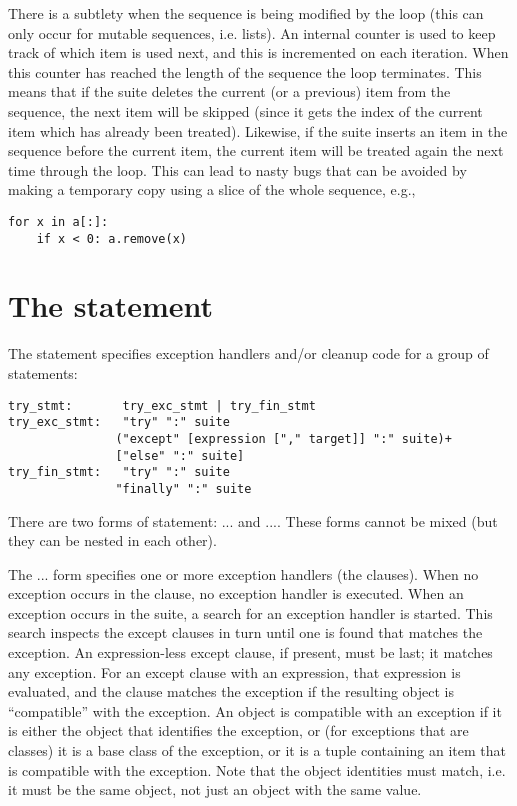  There is a subtlety when the sequence is being modified
by the loop (this can only occur for mutable sequences, i.e. lists).
An internal counter is used to keep track of which item is used next,
and this is incremented on each iteration.  When this counter has
reached the length of the sequence the loop terminates.  This means that
if the suite deletes the current (or a previous) item from the
sequence, the next item will be skipped (since it gets the index of
the current item which has already been treated).  Likewise, if the
suite inserts an item in the sequence before the current item, the
current item will be treated again the next time through the loop.
This can lead to nasty bugs that can be avoided by making a temporary
copy using a slice of the whole sequence, e.g.,

\begin{verbatim}
for x in a[:]:
    if x < 0: a.remove(x)
\end{verbatim}

\section{The  statement\label{try}}

The  statement specifies exception handlers and/or cleanup
code for a group of statements:

\begin{verbatim}
try_stmt:       try_exc_stmt | try_fin_stmt
try_exc_stmt:   "try" ":" suite
               ("except" [expression ["," target]] ":" suite)+
               ["else" ":" suite]
try_fin_stmt:   "try" ":" suite
               "finally" ":" suite
\end{verbatim}

There are two forms of  statement:
... and
....  These forms cannot be mixed (but
they can be nested in each other).

The ... form specifies one or more
exception handlers
(the  clauses).  When no exception occurs in the
 clause, no exception handler is executed.  When an
exception occurs in the  suite, a search for an exception
handler is started.  This search inspects the except clauses in turn until
one is found that matches the exception.  An expression-less except
clause, if present, must be last; it matches any exception.  For an
except clause with an expression, that expression is evaluated, and the
clause matches the exception if the resulting object is ``compatible''
with the exception.  An object is compatible with an exception if it
is either the object that identifies the exception, or (for exceptions
that are classes) it is a base class of the exception, or it is a
tuple containing an item that is compatible with the exception.  Note
that the object identities must match, i.e. it must be the same
object, not just an object with the same value.

